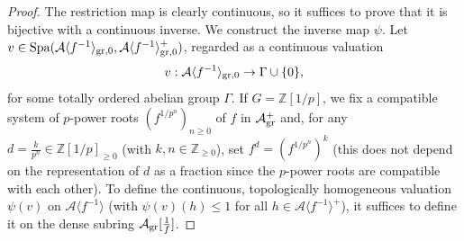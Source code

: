 \documentclass[12pt,twoside,a4paper]{article}
\theoremstyle{definition}
\theoremstyle{remark}
\newcommand\gr{{\rm gr}}
\newcommand\Spa{{\rm Spa}}
\begin{document}
\begin{proof}The restriction map is clearly continuous, so it suffices to prove that it is bijective with a continuous inverse. We construct the inverse map $\psi$. Let $v\in \Spa(\mathcal{A}\langle f^{-1}\rangle_{\gr, 0}, \mathcal{A}\langle f^{-1}\rangle_{\gr, 0}^{+})$, regarded as a continuous valuation \begin{equation*}v: \mathcal{A}\langle f^{-1}\rangle_{\gr,0}\to \Gamma\cup\{0\},\end{equation*}for some totally ordered abelian group $\Gamma$. If $G=\mathbb{Z}[1/p]$, we fix a compatible system of $p$-power roots $(f^{1/p^{n}})_{n\geq0} $ of $f$ in $\mathcal{A}_{\gr}^{+}$ and, for any $d=\frac{k}{p^{n}}\in \mathbb{Z}[1/p]_{\geq0}$ (with $k, n\in \mathbb{Z}_{\geq0}$), set $f^{d}=(f^{1/p^{n}})^{k}$ (this does not depend on the representation of $d$ as a fraction since the $p$-power roots are compatible with each other). To define the continuous, topologically homogeneous valuation $\psi(v)$ on $\mathcal{A}\langle f^{-1}\rangle$ (with $\psi(v)(h)\leq1$ for all $h\in \mathcal{A}\langle f^{-1}\rangle^{+}$), it suffices to define it on the dense subring $\mathcal{A}_{\gr}[\frac{1}{f}]$. 


\end{proof}
\end{document}
